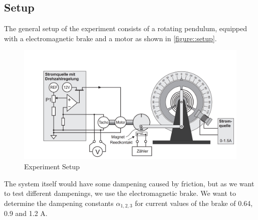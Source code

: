 \subsection{Setup}
The general setup of the experiment consists of a rotating pendulum, equipped with a electromagnetic brake and a motor as shown in \ref{figure::setup}.
\begin{figure} [ht]
	\centering
	\includegraphics[width=400pt]{img/setup.PNG}
	\caption{Experiment Setup \cite{manual}}
	\label{fig::setup}
\end{figure}
The system itself would have some dampening caused by friction, but as we want to test different dampenings, we use the electromagnetic brake.
We want to determine the dampening constants $\alpha_{1, 2, 3}$ for current values of the brake of 0.64, 0.9 and 1.2 A.